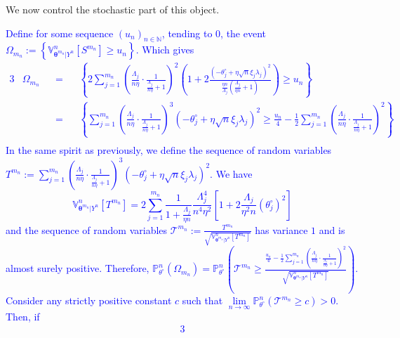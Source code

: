 We now control the stochastic part of this object.

\textcolor{blue}{
Define for some sequence $(u_{n})_{n \in \mathds{N}}$, tending to $0$, the event $\Omega_{m_{n}} := \left\{\mathds{V}_{\boldsymbol{\theta}^{m_{n}} \vert Y^{n}}^{n}\left[S^{m_{n}}\right] \geq u_{n}\right\}.$
Which gives
\begin{alignat*}{3}
& \Omega_{m_{n}} && = && \left\{2 \sum\limits_{j = 1}^{m_{n}} \left(\frac{\Lambda_{j}}{n \eta}\cdot \frac{1}{\frac{\Lambda_{j}}{n \eta} + 1}\right)^{2}\left(1 + 2 \frac{\left(- \theta^{\circ}_{j} + \eta \sqrt{n} \xi_{j} \lambda_{j}\right)^{2}}{\frac{\eta n}{\Lambda_{j}}\left(\frac{\Lambda_{j}}{\eta n} + 1\right)}\right) \geq u_{n}\right\}\\
& && = && \left\{\sum\limits_{j = 1}^{m_{n}} \left(\frac{\Lambda_{j}}{n \eta}\cdot \frac{1}{\frac{\Lambda_{j}}{n \eta} + 1}\right)^{3}\left(- \theta^{\circ}_{j} + \eta \sqrt{n} \xi_{j} \lambda_{j}\right)^{2} \geq \frac{u_{n}}{4} - \frac{1}{2}\sum\limits_{j = 1}^{m_{n}} \left(\frac{\Lambda_{j}}{n \eta}\cdot \frac{1}{\frac{\Lambda_{j}}{n \eta} + 1}\right)^{2}\right\}\\
\end{alignat*}
In the same spirit as previously, we define the sequence of random variables $T^{m_{n}} := \sum\limits_{j = 1}^{m_{n}} \left(\frac{\Lambda_{j}}{n \eta}\cdot \frac{1}{\frac{\Lambda_{j}}{n \eta} + 1}\right)^{3}\left(- \theta^{\circ}_{j} + \eta \sqrt{n} \xi_{j} \lambda_{j}\right)^{2}.$
We have
\[\mathds{V}_{\boldsymbol{\theta}^{m_{n}} \vert Y^{n}}^{n}\left[T^{m_{n}}\right] = 2 \sum\limits_{j = 1}^{m_{n}} \frac{1}{1 + \frac{\Lambda_{j}}{\eta n}}\frac{\Lambda_{j}^{4}}{n^{4} \eta^{2}}\left[1 + 2 \frac{\Lambda_{j}}{\eta^{2} n} \left(\theta^{\circ}_{j}\right)^{2}\right]\]
and the sequence of random variables $\mathcal{T}^{m_{n}} := \frac{T^{m_{n}}}{\sqrt{\mathds{V}_{\boldsymbol{\theta}^{m_{n}} \vert Y^{n}}^{n}\left[T^{m_{n}}\right]}}$ has variance $1$ and is almost surely positive.
Therefore, $\mathds{P}_{\theta^{\circ}}^{n}(\Omega_{m_{n}}) = \mathds{P}_{\theta^{\circ}}^{n}\left(\mathcal{T}^{m_{n}} \geq \frac{\frac{u_{n}}{4} -  \frac{1}{2}\sum\limits_{j = 1}^{m_{n}} \left(\frac{\Lambda_{j}}{n \eta}\cdot \frac{1}{\frac{\Lambda_{j}}{n \eta} + 1}\right)^{2}}{\sqrt{\mathds{V}_{\boldsymbol{\theta}^{m_{n}} \vert Y^{n}}^{n}\left[T^{m_{n}}\right]}}\right)$.
Consider any strictly positive constant $c$ such that $\lim\limits_{n \rightarrow \infty} \mathds{P}_{\theta^{\circ}}^{n}\left(\mathcal{T}^{m_{n}} \geq c\right) > 0$.
Then, if
\begin{alignat*}{3}

\end{alignat*}}
